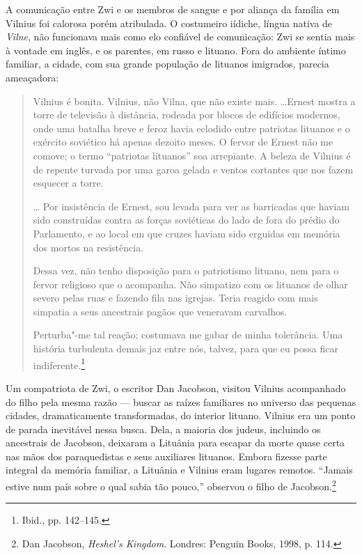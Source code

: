 A comunicação entre Zwi e os membros de sangue e por aliança da família
em Vilnius foi calorosa porém atribulada. O costumeiro iídiche, língua
nativa de \textit{Vilne}, não funcionava mais como elo confiável de comunicação:
Zwi se sentia mais à vontade em inglês, e os parentes, em russo e
lituano. Fora do ambiente íntimo familiar, a cidade, com sua grande
população de lituanos imigrados, parecia ameaçadora:

\begin{quote}
Vilnius é bonita. Vilnius, não Vilna, que não existe mais.
\ldots{}Ernest mostra a torre de televisão à distância, rodeada por
blocos de edifícios modernos, onde uma batalha breve e feroz havia
eclodido entre patriotas lituanos e o exército soviético há apenas
dezoito meses. O fervor de Ernest não me comove; o termo ``patriotas
lituanos'' soa arrepiante. A beleza de Vilnius é de repente turvada por
uma garoa gelada e ventos cortantes que nos fazem esquecer a torre.

\ldots{} Por insistência de Ernest, sou levada para ver as barricadas
que haviam sido construídas contra as forças soviéticas do lado de fora
do prédio do Parlamento, e ao local em que cruzes haviam sido erguidas
em memória dos mortos na resistência.

Dessa vez, não tenho disposição para o patriotismo lituano, nem para o
fervor religioso que o acompanha. Não simpatizo com os lituanos de olhar
severo pelas ruas e fazendo fila nas igrejas. Teria reagido com mais
simpatia a seus ancestrais pagãos que veneravam carvalhos.

Perturba"-me tal reação; costumava me gabar de minha tolerância. Uma
história turbulenta demais jaz entre nós, talvez, para que eu possa
ficar indiferente.\footnote{Ibid., pp. 142--145.}
\end{quote}

Um compatriota de Zwi, o escritor Dan Jacobson, visitou Vilnius
acompanhado do filho pela mesma razão --- buscar as raízes familiares no
universo das pequenas cidades, dramaticamente transformadas, do interior
lituano. Vilnius era um ponto de parada inevitável nessa busca. Dela, a
maioria dos judeus, incluindo os ancestrais de Jacobson, deixaram a
Lituânia para escapar da morte quase certa nas mãos dos paraquedistas
 e seus auxiliares lituanos. Embora fizesse parte integral da memória
familiar, a Lituânia e Vilnius eram lugares remotos. ``Jamais estive num
país sobre o qual sabia tão pouco,'' observou o filho de
Jacobson.\footnote{Dan Jacobson, \textit{Heshel's Kingdom}. Londres: Penguin Books, 1998, p. 114.}

